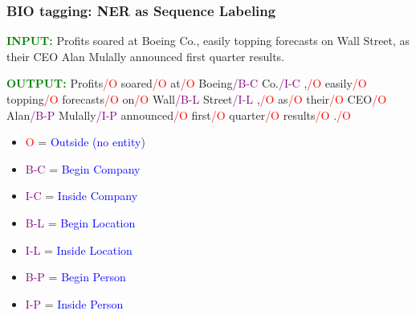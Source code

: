 \documentclass[handout]{beamer}
\begin{document}
\begin{frame}
  \frametitle{BIO tagging: NER as Sequence Labeling}
  \scriptsize
   \textcolor{green}{\textbf{INPUT:}}
  Profits soared at Boeing Co., easily topping forecasts on Wall Street, as their CEO Alan Mulally announced first quarter results. \vspace{0.5cm}

  \textcolor{green}{\textbf{OUTPUT:}}
Profits\textcolor{red}{/O} soared\textcolor{red}{/O} at\textcolor{red}{/O} Boeing\textcolor{purple}{/B-C} Co.\textcolor{purple}{/I-C} ,\textcolor{red}{/O} easily\textcolor{red}{/O} topping\textcolor{red}{/O} forecasts\textcolor{red}{/O} on\textcolor{red}{/O} Wall\textcolor{purple}{/B-L} Street\textcolor{purple}{/I-L} ,\textcolor{red}{/O} as\textcolor{red}{/O} their\textcolor{red}{/O} CEO\textcolor{red}{/O} Alan\textcolor{purple}{/B-P} Mulally\textcolor{purple}{/I-P} announced\textcolor{red}{/O} first\textcolor{red}{/O} quarter\textcolor{red}{/O} results\textcolor{red}{/O} .\textcolor{red}{/O} \vspace{0.5cm}


  \begin{itemize}
    \item \textcolor{red}{O} = \textcolor{blue}{Outside (no entity)}
    \item \textcolor{purple}{B-C} = \textcolor{blue}{Begin Company}
    \item \textcolor{purple}{I-C} = \textcolor{blue}{Inside Company}
    \item \textcolor{purple}{B-L} = \textcolor{blue}{Begin Location}
    \item \textcolor{purple}{I-L} = \textcolor{blue}{Inside Location}
    \item \textcolor{purple}{B-P} = \textcolor{blue}{Begin Person}
    \item \textcolor{purple}{I-P} = \textcolor{blue}{Inside Person}
  \end{itemize}
\end{frame}
\end{document}
